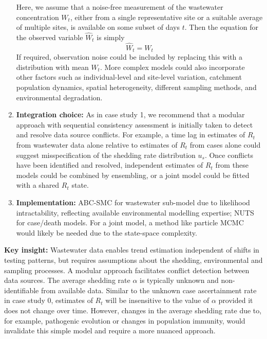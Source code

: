 \documentclass{article}
\begin{document}
\begin{enumerate}
    Here, we assume that a noise-free measurement of the wastewater concentration $W_t$, either from a single representative site or a suitable average of multiple sites, is available on some subset of days $t$. Then the equation for the observed variable $\hat{W}_t$ is simply
    \begin{equation}
        \hat{W}_t=W_t
    \end{equation}
    If required, observation noise could be included by replacing this with a distribution with mean $W_t$. 
    More complex models could also incorporate other factors such as individual-level and site-level variation, catchment population dynamics, spatial heterogeneity, different sampling methods, and environmental degradation.
    \item \textbf{Integration choice:} As in case study 1, we recommend that a modular approach with sequential consistency assessment is initially taken to detect and resolve data source conflicts. For example, a time lag in estimates of $R_t$ from wastewater data alone relative to estimates of $R_t$ from cases alone could suggest misspecification of the shedding rate distribution $u_s$. Once conflicts have been identified and resolved, independent estimates of $R_t$ from these models could be combined by ensembling, or a joint model could be fitted with a shared $R_t$ state. 
    \item \textbf{Implementation:} ABC-SMC for wastewater sub-model due to likelihood intractability, reflecting available environmental modelling expertise; NUTS for case/death models. For a joint model, a method like particle MCMC would likely be needed due to the state-space complexity.
\end{enumerate}

\textbf{Key insight:} Wastewater data enables trend estimation independent of shifts in testing patterns, but requires assumptions about the shedding, environmental and sampling processes. A modular approach facilitates conflict detection between data sources. The average shedding rate $\alpha$ is typically unknown and non-identifiable from available data. Similar to the unknown case ascertainment rate in case study 0, estimates of $R_t$ will be insensitive to the value of $\alpha$ provided it does not change over time. However, changes in the average shedding rate due to, for example, pathogenic evolution or changes in population immunity, would invalidate this simple model and require a more nuanced approach.  
\end{document}
